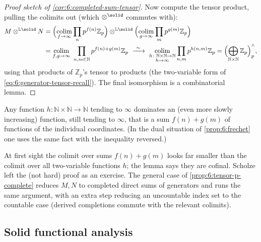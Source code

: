 \begin{proof}[Proof sketch of \cref{cor:6:completed-sum-tensor}]
Now compute the tensor product, pulling the colimits out (which
$\otimes^{\solid}$ commutes with):
\begin{align}
\label{eq:6:tensor-colim}
M\otimes^{\mathbb{L}\solid}N
&=\Bigl(\operatorname*{colim}_{f\to\infty}\prod_{n}p^{f(n)}\mathbb{Z}_p\Bigr)
\otimes^{\mathbb{L}\solid}
\Bigl(\operatorname*{colim}_{g\to\infty}\prod_{m}p^{g(m)}\mathbb{Z}_p\Bigr) \notag\\
&=\operatorname*{colim}_{f,g\to\infty}\ \prod_{n,m\in\mathbb{N}}p^{f(n)+g(m)}\mathbb{Z}_p
\ \xrightarrow{\ \sim\ }\
\operatorname*{colim}_{\substack{h\colon\mathbb{N}\times\mathbb{N}\to\mathbb{N}\\ h\to\infty}}
\prod_{n,m}p^{h(n,m)}\mathbb{Z}_p
=\Bigl(\bigoplus_{\mathbb{N}\times\mathbb{N}}\mathbb{Z}_p\Bigr)^{\wedge}_{p},
\end{align}
using that products of $\mathbb{Z}_p$'s tensor to products (the two-variable form
of \eqref{eq:6:generator-tensor-recall}). The final isomorphism is a
combinatorial lemma.
\end{proof}

\begin{lemma}
\label{lem:6:combinatorial}
Any function $h\colon\mathbb{N}\times\mathbb{N}\to\mathbb{N}$ tending to $\infty$
dominates an (even more slowly increasing) function, still tending to $\infty$,
that is a sum $f(n)+g(m)$ of functions of the individual coordinates. (In the
dual situation of \cref{prop:6:frechet} one uses the same fact with the
inequality reversed.)
\end{lemma}

At first sight the colimit over sums $f(n)+g(m)$ looks far smaller than the
colimit over all two-variable functions $h$; the lemma says they are cofinal.
Scholze left the (not hard) proof as an exercise. The general case of
\cref{prop:6:tensor-p-complete} reduces $M,N$ to completed direct sums of
generators and runs the same argument, with an extra step reducing an uncountable
index set to the countable case (derived completions commute with the relevant
colimits).

\subsection{Solid functional analysis}

